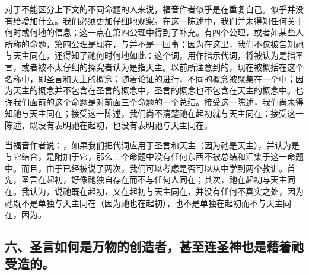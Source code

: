 对于不能区分上下文的不同命题的人来说，福音作者似乎是在重复自己。似乎并没有给增加什么。我们必须更加仔细地观察。在这一陈述中，我们并未得知任何关于何时或何地的信息；这一点在第四公理中得到了补充。有四个公理，或者如某些人所称的命题，第四公理是现在，与并不是一回事；因为在这里，我们不仅被告知祂与天主同在，还得知了祂何时何地如此：这个词，用作指示代词，将被认为是指圣言，或者被不太仔细的探究者认为是指天主。以前所注意到的，现在被概括在这个名称中，即圣言和天主的概念；随着论证的进行，不同的概念被聚集在一个中；因为天主的概念并不包含在圣言的概念中，圣言的概念也不包含在天主的概念中。也许我们面前的这个命题是对前面三个命题的一个总结。接受这一陈述，我们尚未得知祂与天主同在；接受这一陈述，我们尚不清楚祂在起初就与天主同在；接受这一陈述，既没有表明祂在起初，也没有表明祂与天主同在。\par

当福音作者说：，如果我们把代词应用于圣言和天主（因为祂是天主），并认为是与它结合，是附加于它，那么三个命题中没有任何东西不被总结和汇集于这一命题中。而且，由于已经被说了两次，我们可以考虑是否可以从中学到两个教训。首先，圣言在起初，好像祂独自存在而不与任何人同在；其次，祂在起初与天主同在。我认为，说祂既在起初，又在起初与天主同在，并没有任何不真实之处，因为祂既不是单独与天主同在（因为祂也在起初），也不是单独在起初而不与天主同在，因为。\par


\subsection{六、圣言如何是万物的创造者，甚至连圣神也是藉着祂受造的。}


